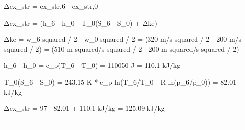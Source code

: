 Δex_str = ex_str,6 - ex_str,0  

Δex_str = (h_6 - h_0 - T_0(S_6 - S_0) + Δke)  

Δke = w_6 squared / 2 - w_0 squared / 2 = (320 m/s squared / 2 - 200 m/s squared / 2)  
= (510 m squared/s squared / 2 - 200 m squared/s squared / 2)  

h_6 - h_0 = c_p(T_6 - T_0) = 110050 J = 110.1 kJ/kg  

T_0(S_6 - S_0) = 243.15 K * c_p ln(T_6/T_0 - R ln(p_6/p_0))  
= 82.01 kJ/kg  

Δex_str = 97 - 82.01 + 110.1 kJ/kg = 125.09 kJ/kg  

---